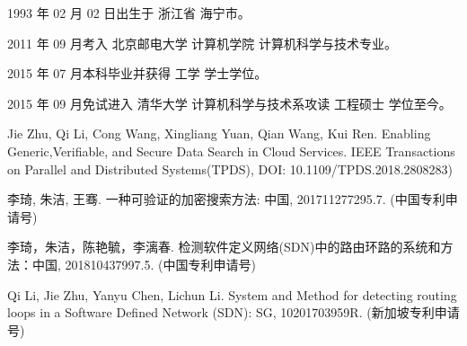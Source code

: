 \begin{resume}


  1993 年 02 月 02 日出生于 浙江省 海宁市。

  2011 年 09 月考入 北京邮电大学 计算机学院 计算机科学与技术专业。

  2015 年 07 月本科毕业并获得 工学 学士学位。

  2015 年 09 月免试进入 清华大学 计算机科学与技术系攻读 工程硕士 学位至今。



  \begin{publications}[before=\publicationskip,after=\publicationskip]
    \item Jie Zhu, Qi Li, Cong Wang, Xingliang Yuan, Qian Wang, Kui Ren. Enabling Generic,Verifiable, and Secure Data Search in Cloud Services. IEEE Transactions on Parallel and Distributed Systems(TPDS), DOI: 10.1109/TPDS.2018.2808283)
  \end{publications}


  \begin{achievements}
    \item 李琦, 朱洁, 王骞. 一种可验证的加密搜索方法: 中国, 201711277295.7. (中国专利申请号)
    \item 李琦，朱洁，陈艳毓，李漓春. 检测软件定义网络(SDN)中的路由环路的系统和方法：中国, 201810437997.5. (中国专利申请号)
    \item Qi Li, Jie Zhu, Yanyu Chen, Lichun Li. System and Method for detecting routing loops in a Software Defined Network (SDN): SG, 10201703959R. (新加坡专利申请号)
  \end{achievements}

\end{resume}

